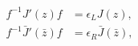 \begin{equation}
\label{eq:JepsLR}
\begin{split}
  f^{-1} J'(z) f &= \epsilon_L J(z),\\
  f^{-1} \bar{J}'(\bar{z}) f &= \epsilon_R \bar{J}(\bar{z}),
\end{split}
\end{equation}

